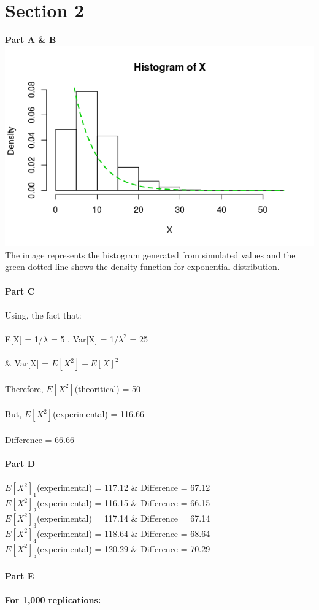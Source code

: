 \documentclass[12pt,a4paper]{report}
\begin{document}
\section{Section 2}
\textbf{Part A \& B}
\\
\includegraphics[scale=0.8]{hist2.png}
\\
The image represents the histogram generated from simulated values and the green dotted line shows the density function for exponential distribution.
\\\\
\textbf{Part C}
\\\\
Using, the fact that:\\\\
E[X] = 1/$\lambda$ = 5 , Var[X] = 1/${\lambda}^2$ = 25\\\\
\& Var[X] = $E[X^2] - {E[X]}^2$\\\\
Therefore, $E[X^2]$(theoritical) = 50\\\\
But, $E[X^2]$(experimental) = 116.66\\\\
Difference = 66.66\\\\
\textbf{Part D}\\\\
${E[X^2]}_1$(experimental) = 117.12 \& Difference = 67.12\\
${E[X^2]}_2$(experimental) = 116.15 \& Difference = 66.15\\
${E[X^2]}_3$(experimental) = 117.14 \& Difference = 67.14\\
${E[X^2]}_4$(experimental) = 118.64 \& Difference = 68.64\\
${E[X^2]}_5$(experimental) = 120.29 \& Difference = 70.29\\
\\
\textbf{Part E}
\\\\
\textbf{For 1,000 replications:}\\
\end{document}

